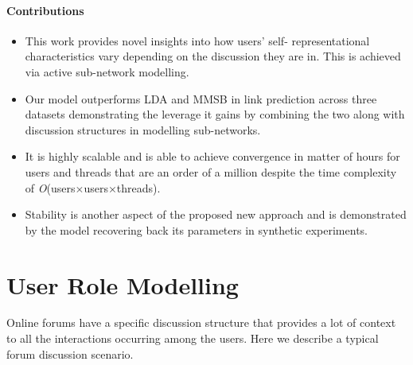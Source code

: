 \documentclass{sig-alternate}
\newcommand{\order}[1]{\textit{O}(#1)}
\begin{document}
\paragraph{Contributions}
\begin{itemize}
  \item This work provides novel insights
into how users' self- representational characteristics vary
depending on the discussion they are in. This is achieved via active sub-network
modelling.
\item Our model outperforms LDA and MMSB in link prediction across three
datasets demonstrating the leverage it gains by combining the two along with discussion
structures in modelling sub-networks.
\item It is highly scalable and is able to achieve convergence in
matter of hours for users and threads that are an order of a million despite the
time complexity of \order{users$\times$users$\times$threads}.
\item  Stability
is another aspect of the proposed new approach and is demonstrated by
the model recovering back its parameters in synthetic experiments. 
\end{itemize} 




\section{User Role Modelling}
\label{sec:approach}
Online forums have a specific discussion structure  that
provides a lot of context to all the interactions occurring among the users.
Here we describe a typical forum discussion scenario.
\end{document}
